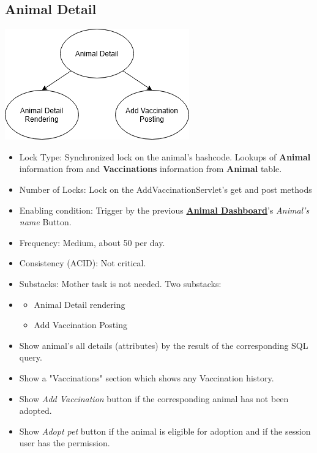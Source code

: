 \documentclass[a4paper]{article}
\begin{document}
\hypertarget{animal_detail}{\subsection{Animal Detail}}
\includegraphics[scale = 0.6]{animal_detail.png}

\begin{itemize}
	\item Lock Type: Synchronized lock on the animal's hashcode. Lookups of \textbf{Animal} information from  and \textbf{Vaccinations} information from \textbf{Animal} table.
	\item Number of Locks: Lock on the AddVaccinationServlet's get and post methods
	\item Enabling condition: Trigger by the previous \underline{\textbf{Animal Dashboard}}'s \textit{Animal's name} Button.
	\item Frequency: Medium, about 50 per day.
	\item Consistency (ACID): Not critical.
	\item Substacks: Mother task is not needed. Two substacks:
	\item   \begin{itemize}
				\item Animal Detail rendering
				\item Add Vaccination Posting
			\end{itemize}
\end{itemize}


\begin{itemize}
	\item Show animal's all details (attributes) by the result of the corresponding SQL query.
	\item Show a "Vaccinations" section which shows any Vaccination history.
	\item Show \textit{Add Vaccination} button if the corresponding animal has not been adopted.
	\item Show \textit {Adopt pet} button if the animal is eligible for adoption and if the session user has the permission.
\end{itemize}
\end{document}
